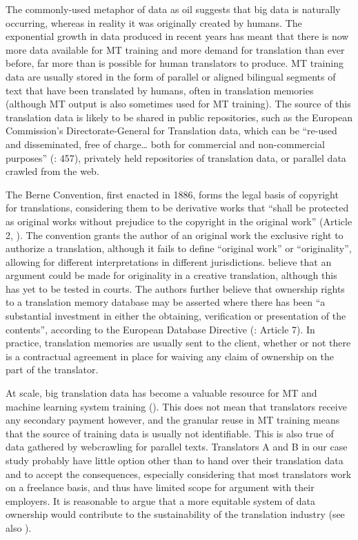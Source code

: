 \documentclass[output=paper]{langscibook}
\begin{document}
The commonly-used metaphor of data as oil suggests that big data is naturally occurring, whereas in reality it was originally created by humans. The exponential growth in data produced in recent years has meant that there is now more data available for MT training and more demand for translation than ever before, far more than is possible for human translators to produce. MT training data are usually stored in the form of parallel or aligned bilingual segments of text that have been translated by humans, often in translation memories (although MT output is also sometimes used for MT training). The source of this translation data is likely to be shared in public repositories, such as the European Commission’s Directorate-General for Translation data, which can be “re-used and disseminated, free of charge… both for commercial and non-commercial purposes” (\citealt{SteinbergerSchlüter2012}: 457), privately held repositories of translation data, or parallel data crawled from the web. 

The Berne Convention, first enacted in 1886, forms the legal basis of copyright for translations, considering them to be derivative works that “shall be protected as original works without prejudice to the copyright in the original work” (Article 2, \citealt{WIPO1979}). The convention grants the author of an original work the exclusive right to authorize a translation, although it fails to define “original work” or “originality”, allowing for different interpretations in different jurisdictions. \citet{TrousselDebussche2014} believe that an argument could be made for originality in a creative translation, although this has yet to be tested in courts. The authors further believe that ownership rights to a translation memory database may be asserted where there has been “a substantial investment in either the obtaining, verification or presentation of the contents”, according to the European Database Directive (\citealt{EuropeanParliament1996}: Article 7). In practice, translation memories are usually sent to the client, whether or not there is a contractual agreement in place for waiving any claim of ownership on the part of the translator.

At scale, big translation data has become a valuable resource for MT and machine learning system training (\citealt{MoorkensLewis2019}). This does not mean that translators receive any secondary payment however, and the granular reuse in MT training means that the source of training data is usually not identifiable. This is also true of data gathered by webcrawling for parallel texts. Translators A and B in our case study probably have little option other than to hand over their translation data and to accept the consequences, especially considering that most translators work on a freelance basis, and thus have limited scope for argument with their employers. It is reasonable to argue that a more equitable system of data ownership would contribute to the sustainability of the translation industry (see also ).
\end{document}
